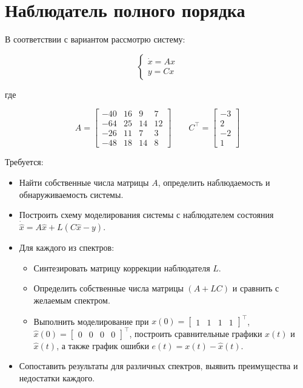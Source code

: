 \documentclass[a4paper,12pt]{article}
\begin{document}
\newpage
\section{Наблюдатель полного порядка}
\label{sec:task2}

В соответствии с вариантом рассмотрю систему:

\[
\begin{cases}
	\dot{x} = Ax \\
	y = Cx
\end{cases}
\]

где

\[
A =
\begin{bmatrix}
	-40 & 16  &  9  &  7 \\
	-64 & 25  & 14  & 12 \\
	-26 & 11  &  7  &  3 \\
	-48 & 18  & 14  &  8
\end{bmatrix}
\qquad
C^{\top} =
\begin{bmatrix}
	-3 \\ 2 \\ -2 \\ 1
\end{bmatrix}
\]

Требуется:

\begin{itemize}
	\item Найти собственные числа матрицы $A$, определить наблюдаемость и обнаруживаемость системы.
	\item Построить схему моделирования системы с наблюдателем состояния
	$\dot{\hat{x}} = A\hat{x} + L(C\hat{x} - y)$.
	\item Для каждого из спектров:
	\begin{itemize}
		\item Синтезировать матрицу коррекции наблюдателя $L$.
		\item Определить собственные числа матрицы $(A + LC)$ и сравнить с желаемым спектром.
		\item Выполнить моделирование при
		$x(0) = \begin{bmatrix}1&1&1&1\end{bmatrix}^{\top}$,
		$\hat{x}(0) = \begin{bmatrix}0&0&0&0\end{bmatrix}^{\top}$,
		построить сравнительные графики $x(t)$ и $\hat{x}(t)$,
		а также график ошибки $e(t) = x(t) - \hat{x}(t)$.
	\end{itemize}
	\item Сопоставить результаты для различных спектров, выявить преимущества и недостатки каждого.
\end{itemize}
\end{document}
